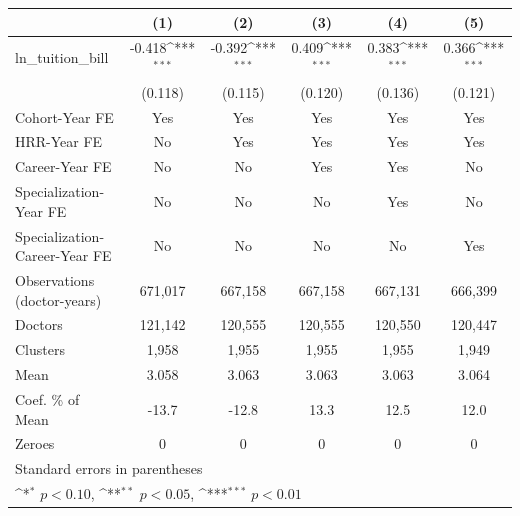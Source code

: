 {
\def\sym#1{\ifmmode^{#1}\else\(^{#1}\)\fi}
\begin{tabular}{l*{5}{c}}
\hline\hline
                    &\multicolumn{1}{c}{(1)}         &\multicolumn{1}{c}{(2)}         &\multicolumn{1}{c}{(3)}         &\multicolumn{1}{c}{(4)}         &\multicolumn{1}{c}{(5)}         \\
\hline
ln\_tuition\_bill     &      -0.418\sym{***}&      -0.392\sym{***}&       0.409\sym{***}&       0.383\sym{***}&       0.366\sym{***}\\
                    &     (0.118)         &     (0.115)         &     (0.120)         &     (0.136)         &     (0.121)         \\
[1em]
Cohort-Year FE      &         Yes         &         Yes         &         Yes         &         Yes         &         Yes         \\
[1em]
HRR-Year FE         &          No         &         Yes         &         Yes         &         Yes         &         Yes         \\
[1em]
Career-Year FE      &          No         &          No         &         Yes         &         Yes         &          No         \\
[1em]
Specialization-Year FE&          No         &          No         &          No         &         Yes         &          No         \\
[1em]
Specialization-Career-Year FE&          No         &          No         &          No         &          No         &         Yes         \\
\hline
Observations (doctor-years)&     671,017         &     667,158         &     667,158         &     667,131         &     666,399         \\
Doctors             &     121,142         &     120,555         &     120,555         &     120,550         &     120,447         \\
Clusters            &       1,958         &       1,955         &       1,955         &       1,955         &       1,949         \\
Mean                &       3.058         &       3.063         &       3.063         &       3.063         &       3.064         \\
Coef. \% of Mean    &       -13.7         &       -12.8         &        13.3         &        12.5         &        12.0         \\
Zeroes              &           0         &           0         &           0         &           0         &           0         \\
\hline\hline
\multicolumn{6}{l}{\footnotesize Standard errors in parentheses}\\
\multicolumn{6}{l}{\footnotesize \sym{*} \(p<0.10\), \sym{**} \(p<0.05\), \sym{***} \(p<0.01\)}\\
\end{tabular}
}
